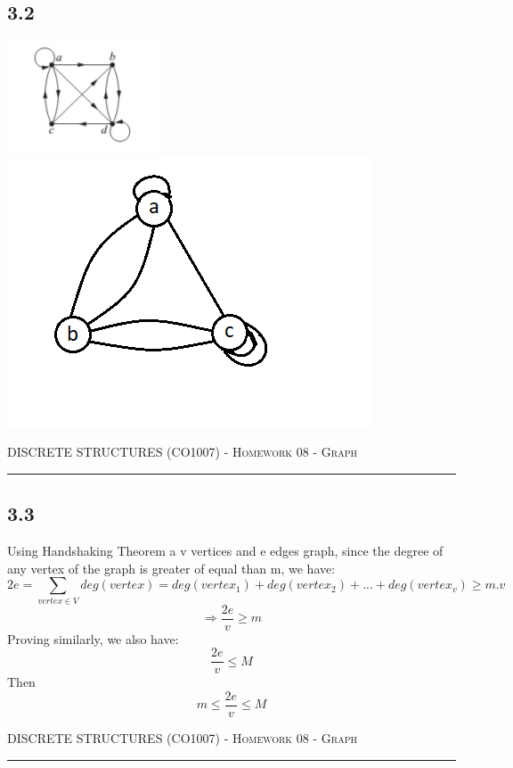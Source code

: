 \documentclass{article}
\begin{document}
\subsection*{3.2}
\includegraphics[scale = 2]{problem_3/graph_3.2.1.png}
\includegraphics[]{problem_3/graph_3.2.2.png}
\newpage

{\scshape } \hfill {\scshape DISCRETE STRUCTURES (CO1007) - Homework 08 - Graph} \hfill {\scshape }
 
\smallskip

\hrule

\bigskip

\bigskip 
\subsection*{3.3}
Using Handshaking Theorem a v vertices and e edges graph, since the degree of any vertex of the graph is greater of equal than m, we have:
$$ 2e = \sum_{vertex \in V}deg(vertex) = deg(vertex_1) + deg(vertex_2) +...+ deg(vertex_v) \geqslant m.v $$
$$ \Rightarrow \frac{2e}{v} \geqslant m $$
Proving similarly, we also have:
$$ \frac{2e}{v} \leqslant M $$
Then
$$ m \leqslant \frac{2e}{v} \leqslant M $$
\newpage

{\scshape } \hfill {\scshape DISCRETE STRUCTURES (CO1007) - Homework 08 - Graph} \hfill {\scshape }
 
\smallskip

\hrule
\end{document}
